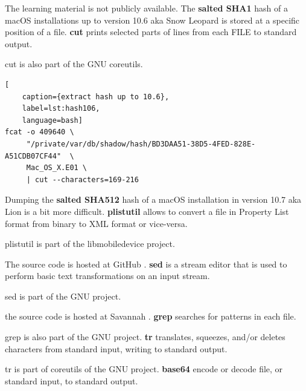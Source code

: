 The learning material is not publicly available.\newline
\newline
\noindent The \textbf{salted SHA1} hash of a macOS installations up to version 10.6 aka Snow Leopard is stored at a specific position of a file.\newline
\newline
\noindent \textbf{cut} prints selected parts of lines from each FILE to standard output.

cut is also part of the GNU coreutils.

\begin{lstlisting}[
    caption={extract hash up to 10.6},
    label=lst:hash106,
    language=bash]
fcat -o 409640 \
     "/private/var/db/shadow/hash/BD3DAA51-38D5-4FED-828E-A51CDB07CF44"  \
     Mac_OS_X.E01 \
     | cut --characters=169-216
\end{lstlisting}

\noindent Dumping the \textbf{salted SHA512} hash of a macOS installation in version 10.7 aka Lion is a bit more difficult.\newline
\newline
\noindent \textbf{plistutil} allows to convert a file in Property List format from binary to XML format or vice-versa.

plistutil is part of the libmobiledevice project.

The source code is hosted at GitHub \cite{Libplist}.\newline
\newline
\noindent \textbf{sed} is a stream editor that is used to perform basic text transformations on an input stream.

sed is part of the GNU project.

the source code is hosted at Savannah \cite{Sed}.\newline
\newline
\noindent \textbf{grep} searches for patterns in each file.

grep is also part of the GNU project.\newline
\newline
\noindent \textbf{tr} translates, squeezes, and/or deletes characters from standard input, writing to standard output.

tr is part of coreutils of the GNU project.\newline
\newline
\noindent \textbf{base64} encode or decode file, or standard input, to standard output.

